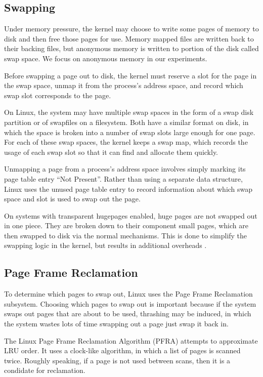 \documentclass[twocolumn,11pt]{article}
\begin{document}
\subsection{Swapping}

Under memory pressure, the kernel may choose to write some pages of memory to
disk and then free those pages for use. Memory mapped files are written back to
their backing files, but anonymous memory is written to portion of the disk
called swap space. We focus on anonymous memory in our experiments.

Before swapping a page out to disk, the kernel must reserve a slot for the page
in the swap space, unmap it from the process's address space, and record which
swap slot corresponds to the page.

On Linux, the system may have multiple swap spaces in the form of a swap disk
partition or of swapfiles on a filesystem. Both have a similar format on disk,
in which the space is broken into a number of swap slots large enough for one
page. For each of these swap spaces, the kernel keeps a swap map, which records
the usage of each swap slot so that it can find and allocate them quickly.

Unmapping a page from a process's address space involves simply marking its page
table entry ``Not Present''. Rather than using a separate data structure, Linux
uses the unused page table entry to record information about which swap space
and slot is used to swap out the page.

On systems with transparent hugepages enabled, huge pages are not swapped out in
one piece.  They are broken down to their component small pages, which are then
swapped to disk via the normal mechanisms. This is done to simplify the swapping
logic in the kernel, but results in additional overheads
\cite{corbet_transparent}.

\subsection{Page Frame Reclamation}

To determine which pages to swap out, Linux uses the Page Frame Reclamation
subsystem. Choosing which pages to swap out is important because if the system
swaps out pages that are about to be used, thrashing may be induced, in which
the system wastes lots of time swapping out a page just swap it back in.

The Linux Page Frame Reclamation Algorithm (PFRA) attempts to approximate LRU
order. It uses a clock-like algorithm, in which a list of pages is scanned
twice. Roughly speaking, if a page is not used between scans, then it is a
condidate for reclamation.
\end{document}
